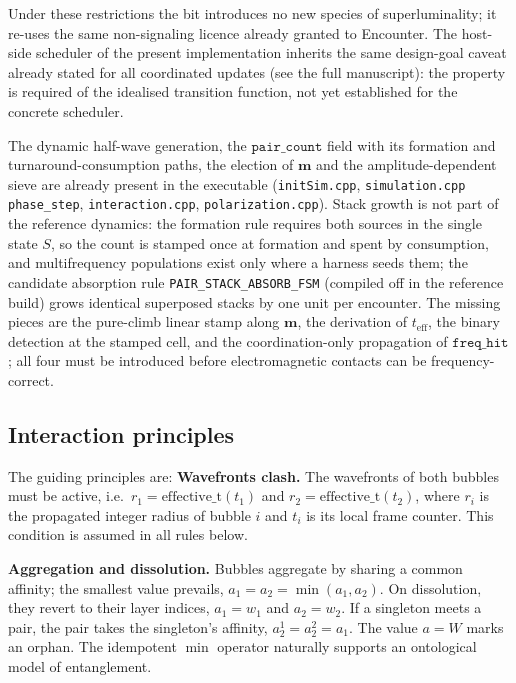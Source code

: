 \documentclass{ijuc}
\begin{document}
Under these restrictions the bit introduces no new species of superluminality; it re-uses the same non-signaling licence already granted to Encounter. The host-side scheduler of the present implementation inherits the same design-goal caveat already stated for all coordinated updates (see the full manuscript): the property is required of the idealised transition function, not yet established for the concrete scheduler.

The dynamic half-wave generation, the $\texttt{pair\_count}$ field with its formation and turnaround-consumption paths, the election of $\boldsymbol{m}$ and the amplitude-dependent sieve are already present in the executable (\texttt{initSim.cpp}, \texttt{simulation.cpp} \texttt{phase\_step}, \texttt{interaction.cpp}, \texttt{polarization.cpp}). Stack growth is not part of the reference dynamics: the formation rule requires both sources in the single state $S$, so the count is stamped once at formation and spent by consumption, and multifrequency populations exist only where a harness seeds them; the candidate absorption rule \texttt{PAIR\_STACK\_ABSORB\_FSM} (compiled off in the reference build) grows identical superposed stacks by one unit per encounter. The missing pieces are the pure-climb linear stamp along $\boldsymbol{m}$, the derivation of $t_{\mathrm{eff}}$, the binary detection at the stamped cell, and the coordination-only propagation of $\texttt{freq\_hit}$; all four must be introduced before electromagnetic contacts can be frequency-correct.

\subsection{Interaction principles}
The guiding principles are:
\medskip\noindent\textbf{Wavefronts clash.} The wavefronts of both bubbles must be active, i.e.\ $r_1 = \mathrm{effective\_t}(t_1)$ and $r_2 = \mathrm{effective\_t}(t_2)$, where $r_i$ is the propagated integer radius of bubble $i$ and $t_i$ is its local frame counter. This condition is assumed in all rules below.

\medskip\noindent\textbf{Aggregation and dissolution.}\label{subsec-role-of-affinity} Bubbles aggregate by sharing a common affinity; the smallest value prevails, $a_1=a_2=\min(a_1,a_2)$. On dissolution, they revert to their layer indices, $a_1=w_1$ and $a_2=w_2$. If a singleton meets a pair, the pair takes the singleton's affinity, $a_2^1=a_2^2=a_1$. The value $a=W$ marks an orphan. The idempotent $\min$ operator naturally supports an ontological model of entanglement.
\end{document}

